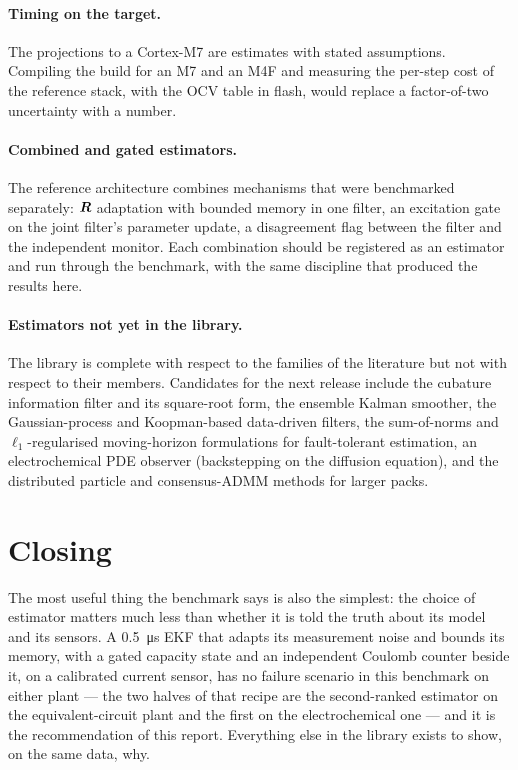 \paragraph{Timing on the target.} The projections to a Cortex-M7 are estimates with stated
assumptions. Compiling the  build for an M7 and an M4F and measuring the
per-step cost of the reference stack, with the OCV table in flash, would replace a factor-of-two
uncertainty with a number.

\paragraph{Combined and gated estimators.} The reference architecture combines mechanisms
that were benchmarked separately: $\bm{R}$ adaptation with bounded memory in one filter, an
excitation gate on the joint filter's parameter update, a disagreement flag between the filter
and the independent monitor. Each combination should be registered as an estimator and run
through the benchmark, with the same discipline that produced the results here.

\paragraph{Estimators not yet in the library.} The library is complete with respect to the
families of the literature but not with respect to their members. Candidates for the next
release include the cubature information filter and its square-root form, the ensemble
Kalman smoother, the Gaussian-process and Koopman-based data-driven filters, the
sum-of-norms and $\ell_1$-regularised moving-horizon formulations for fault-tolerant
estimation, an electrochemical PDE observer (backstepping on the diffusion equation), and the
distributed particle and consensus-ADMM methods for larger packs.

\section{Closing}

The most useful thing the benchmark says is also the simplest: the choice of estimator
matters much less than whether it is told the truth about its model and its sensors. A
\SI{0.5}{\micro\second} EKF that adapts its measurement noise and bounds its memory, with a
gated capacity state and an independent Coulomb counter beside it, on a calibrated current
sensor, has no failure scenario in this benchmark on either plant --- the two halves of that
recipe are the second-ranked estimator on the equivalent-circuit plant and the first on the
electrochemical one --- and it is the recommendation of this report. Everything else in the
library exists to show, on the same data, why.
